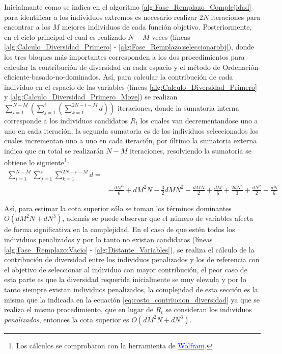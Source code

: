Inicialmante como se indica en el algoritmo \ref{alg:Fase_Remplazo_Complejidad} para identificar a los individuos extremos es necesario realizar $2N$ iteraciones para encontrar a los $M$ mejores individuos de cada función objetivo.
%
Posteriormente, en el ciclo principal el cual es realizado $N-M$ veces (líneas \ref{alg:Calculo_Diversidad_Primero} - \ref{alg:Fase_Remplazo:seleccionarobj}), donde los tres bloques más importantes corresponden a los dos procedimientos para calcular la contribución de diversidad en cada espacio y el método de Ordenación-eficiente-basado-no-dominados.
%
Así, para calcular la contribución de cada individuo en el espacio de las variables (líneas \ref{alg:Calculo_Diversidad_Primero} y \ref{alg:Calculo_Diversidad_Primero_Move}) se realizan $\sum_{i=1}^{N-M}( \sum_{j=1}^{i} ( \sum_{k=1}^{2N-i-M} d ) )$ iteraciones, donde la sumatoria interna corresponde a los individuos candidatos $R_{t}$ los cuales van decrementandose uno a uno en cada iteración, la segunda sumatoria es de los individuos seleccionados los cuales incrementan uno a uno en cada iteración, por último la sumatoria externa indica que en total se realizarán $N-M$ iteraciones, resolviendo la sumatoria se obtiene lo siguiente\footnote{Los cálculos se comprobaron con la herramienta de \href{http://m.wolframalpha.com/input/?i=sum\%5B+sum\%5B+++sum\%5B+d\%2C+k\%2C1\%2C2N-i-M+\%5D+\%2C+\%7Bj\%2C1\%2Ci\%7D\%5D++\%2C+\%7Bi\%2C1\%2CN-M\%7D\%5D}{\textcolor{blue}{Wolfram}}.}:
\begin{equation} \label{eq:costo_contriucion_diversidad}
\begin{split}
\sum_{i=1}^{N-M} \sum_{j=1}^{i} \sum_{k=1}^{2N-i-M}  d = &\\
& -\frac{dM^3}{6} + d M^2 N - \frac{3}{2} d M N^2 - \frac{dMN}{2} + \frac{dM}{6} + \frac{2dN^3}{3} + \frac{dN^2}{2} - \frac{dN}{6}
\end{split}
\end{equation}

Así, para estimar la cota superior sólo se toman los términos dominantes $O(dM^2N + dN^3)$, además se puede observar que el número de variables afecta de forma significativa en la complejidad.
%
En el caso de que estén todos los individuos penalizados y por lo tanto no existan candidatos (líneas \ref{alg:Fase_Remplazo:Vacio} - \ref{alg:Distante_Variables}), se realiza el cálculo de la contribución de diversidad entre los individuos penalizados y los de referencia con el objetivo de seleccionar al individuo con mayor contribución, el peor caso de esta parte es que la diversidad requerida inicialmente se muy elevada y por lo tanto siempre existan individuos penalizados, la complejidad de esta sección es la misma que la indicada en la ecuación \ref{eq:costo_contriucion_diversidad} ya que se realiza el mismo procedimiento, que en lugar de $R_t$ se consideran los individuos \textit{penalizados}, entonces la cota superior es $O(dM^2N + dN^3)$.

